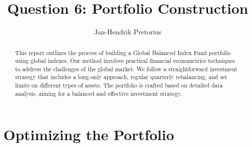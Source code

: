 \documentclass[11pt,preprint, authoryear]{elsarticle}
\numberwithin{equation}{section}
\numberwithin{figure}{section}
\numberwithin{table}{section}
\begin{document}
\begin{frontmatter}  %

\title{Question 6: Portfolio Construction}





\author[Add1]{Jan-Hendrik Pretorius}





\address[Add1]{Stellenbosch University}


\begin{abstract}
\small{
This report outlines the process of building a Global Balanced Index
Fund portfolio using global indexes. Our method involves practical
financial econometrics techniques to address the challenges of the
global market. We follow a straightforward investment strategy that
includes a long-only approach, regular quarterly rebalancing, and set
limits on different types of assets. The portfolio is crafted based on
detailed data analysis, aiming for a balanced and effective investment
strategy.
}
\end{abstract}

\vspace{1cm}





\vspace{0.5cm}

\end{frontmatter}

\setcounter{footnote}{0}



\pagestyle{fancy}
\chead{}
\lfoot{}
\lhead{}
\cfoot{}


\headsep 35pt %




\hypertarget{optimizing-the-portfolio}{%
\section{Optimizing the Portfolio}\label{optimizing-the-portfolio}}
\end{document}
